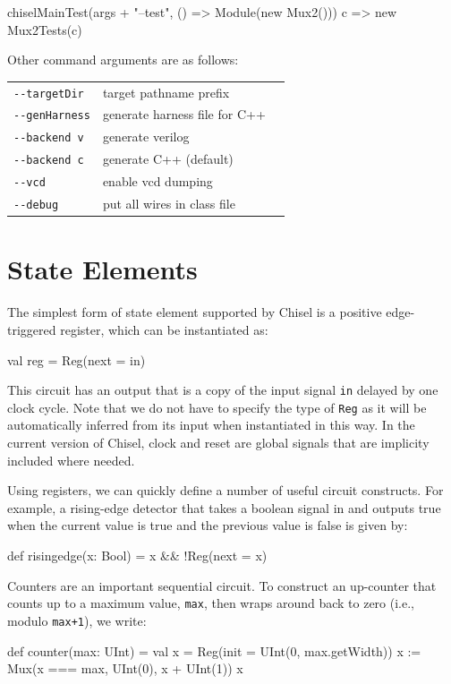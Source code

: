 \documentclass[twocolumn,10pt]{article}
\newcommand{\comment}[1]{\emph{Comment: #1}}
\renewcommand{\comment}[1]{}
\begin{document}
\begin{scala}
chiselMainTest(args + "--test", () => Module(new Mux2())){ 
  c => new Mux2Tests(c) 
}
\end{scala}

Other command arguments are as follows:
\begin{tabular}{lll}
\verb+--targetDir+ & target pathname prefix \\
\verb+--genHarness+ & generate harness file for C++ \\
\verb+--backend v+ & generate verilog \\
\verb+--backend c+ & generate C++ (default)\\
\verb+--vcd+ & enable vcd dumping \\
\verb+--debug+ & put all wires in class file \\
\end{tabular}

\comment{What does it mean to generate a harness file?}

\section{State Elements}
\label{sec:sequential}


The simplest form of state element supported by Chisel is a
positive edge-triggered register, which can be instantiated
as:
\begin{scala}
val reg = Reg(next = in)
\end{scala}

\noindent
This circuit has an output that is a copy of the input signal \verb+in+
delayed by one clock cycle.  Note that we do not have to specify the
type of \verb+Reg+ as it will be automatically inferred from its input
when instantiated in this way.  In the current version of Chisel,
clock and reset are global signals that are implicity included where
needed.

Using registers, we can quickly define a number of useful circuit
constructs.  For example, a rising-edge detector that takes a boolean
signal in and outputs true when the current value is true and the
previous value is false is given by:
\begin{scala}
def risingedge(x: Bool) = x && !Reg(next = x)
\end{scala}

Counters are an important sequential circuit.  To construct an
up-counter that counts up to a maximum value, \verb+max+, then wraps
around back to zero (i.e., modulo \verb!max+1!), we write:
\begin{scala}
def counter(max: UInt) = {
  val x = Reg(init = UInt(0, max.getWidth))
  x := Mux(x === max, UInt(0), x + UInt(1))
  x
}
\end{scala}
\end{document}
